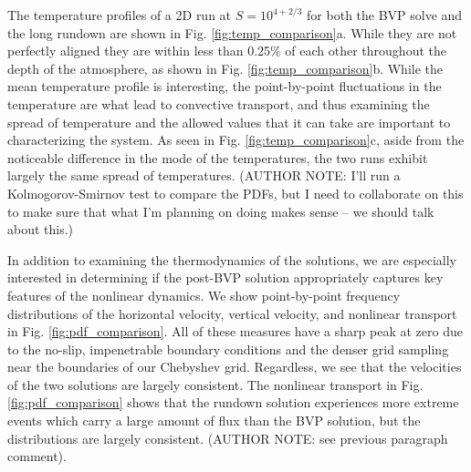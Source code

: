 \documentclass[aps, pre, onecolumn, nofootinbib, notitlepage, groupedaddress, amsfonts, amssymb, amsmath, longbibliography]{revtex4-1}
\begin{document}
The temperature profiles of a 2D run at $S = 10^{4 + 2/3}$ 
for both the BVP solve and the long rundown are shown in
Fig. \ref{fig:temp_comparison}a.  While they are not perfectly aligned they are within less than
0.25\% of each other throughout the depth of the atmosphere, as shown in Fig. \ref{fig:temp_comparison}b.
While the mean temperature profile is interesting, the point-by-point fluctuations in the
temperature are what lead to convective transport, and thus examining the spread of temperature
and the allowed values that it can take are important to characterizing the system.  As seen
in Fig. \ref{fig:temp_comparison}c, aside from the noticeable difference in the mode of the
temperatures, the two runs exhibit largely the same spread of temperatures.
(AUTHOR NOTE: I'll run a Kolmogorov-Smirnov test to compare the PDFs, but I need to collaborate on this
to make sure that what I'm planning on doing makes sense -- we should talk about this.)

In addition to examining the thermodynamics of the solutions, we are especially interested in
determining if the post-BVP solution appropriately captures key features of the nonlinear dynamics.
We show point-by-point frequency distributions of the horizontal velocity, vertical velocity,
and nonlinear transport in Fig. \ref{fig:pdf_comparison}.  All of these measures have a sharp
peak at zero due to the no-slip, impenetrable boundary conditions and the denser grid sampling
near the boundaries of our Chebyshev grid.  Regardless, we see that the velocities of the 
two solutions are largely consistent.  The nonlinear transport in Fig. \ref{fig:pdf_comparison}
shows that the rundown solution experiences more extreme events which carry a large amount of
flux than the BVP solution, but the distributions are largely consistent.
(AUTHOR NOTE: see previous paragraph comment).
\end{document}

